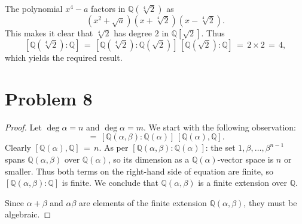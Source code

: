 \documentclass[11pt]{article}
\begin{document}
The polynomial $x^{4} - a$ factors in $\mathbb{Q}(\sqrt[4]{2})$ as
\[
  (x^{2} + \sqrt{a})(x + \sqrt[4]{2})(x - \sqrt[4]{2}).
\]
This makes it clear that $\sqrt[4]{2}$ has degree $2$ in $\mathbb{Q}[\sqrt{2}]$. Thus
\[
  [\mathbb{Q}(\sqrt[4]{2}) : \mathbb{Q}] \, = \, [\mathbb{Q}(\sqrt[4]{2}) : \mathbb{Q}(\sqrt{2})] \, [\mathbb{Q}(\sqrt{2}) : \mathbb{Q}] \, = \, 2 \times 2 \, = \, 4,
\]
which yields the required result.


\section{Problem 8}

\begin{proof}
  Let $\deg \alpha = n$ and $\deg \alpha = m$. We start with the following observation:
  \begin{equation}
    [\mathbb{Q}(\alpha, \beta) : \mathbb{Q}] \, = \, [\mathbb{Q}(\alpha, \beta) : \mathbb{Q}(\alpha)] \, [\mathbb{Q}(\alpha), \mathbb{Q}].
  \end{equation}
  Clearly $[\mathbb{Q}(\alpha), \mathbb{Q}] \, = \, n$. As per $[\mathbb{Q}(\alpha, \beta) : \mathbb{Q}(\alpha)]$: the set $1, \beta, \ldots, \beta^{n - 1}$ spans $\mathbb{Q}(\alpha, \beta)$ over $\mathbb{Q}(\alpha)$, so its dimension as a $\mathbb{Q}(\alpha)$-vector space is $n$ or smaller. Thus both terms on the right-hand side of equation are finite, so $[\mathbb{Q}(\alpha, \beta) : \mathbb{Q}]$ is finite. We conclude that $\mathbb{Q}(\alpha, \beta)$ is a finite extension over $\mathbb{Q}$.

  Since $\alpha + \beta$ and $\alpha \beta$ are elements of the finite extension $\mathbb{Q}(\alpha, \beta)$, they must be algebraic.
\end{proof}

\end{document}
